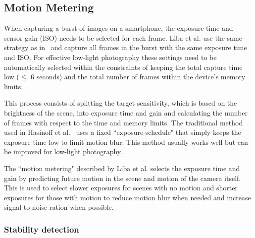 \documentclass{sig-alternate}
\begin{document}

\subsection{Motion Metering}
\label{sec:motionMetering}

When capturing a burst of images on a smartphone, the exposure time and sensor gain (ISO) needs to be selected for each frame. Liba et al. use the same strategy as in~\cite{Hasinoff2016} and capture all frames in the burst with the same exposure time and ISO. For effective low-light photography these settings need to be automatically selected within the constraints of keeping the total capture time low ($\leq$ 6 seconds) and the total number of frames within the device's memory limits.

This process consists of splitting the target sensitivity, which is based on the brightness of the scene, into exposure time and gain and calculating the number of frames with respect to the time and memory limits. The traditional method used in Hasinoff et al.~\cite{Hasinoff2016} uses a fixed ``exposure schedule" that simply keeps the exposure time low to limit motion blur. This method usually works well but can be improved for low-light photography.

The ``motion metering" described by Liba et al. selects the exposure time and gain by predicting future motion in the scene and motion of the camera itself. This is used to select slower exposures for scenes with no motion and shorter exposures for those with motion to reduce motion blur when needed and increase signal-to-noise ration when possible.




\subsubsection{Stability detection}
\end{document}

